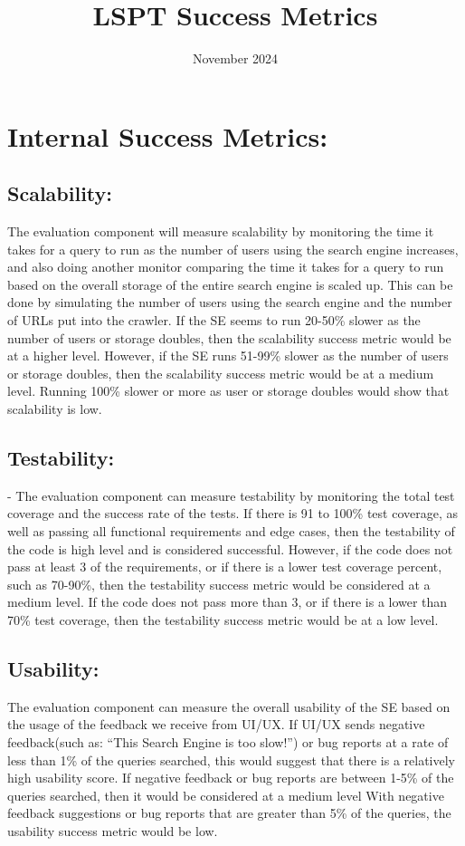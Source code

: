 \documentclass{article}
\title{LSPT Success Metrics}
\date{November 2024}
\begin{document}
\maketitle

\section{Internal Success Metrics:}
\medskip
\subsection{Scalability:}
The evaluation component will measure scalability by monitoring the time it takes
for a query to run as the number of users using the search engine increases, and 
also doing another monitor comparing the time it takes for a query to run based on 
the overall storage of the entire search engine is scaled up. This can be done by 
simulating the number of users using the search engine and the number of URLs put 
into the crawler. If the SE seems to run 20-50\% slower as the number of users or 
storage doubles, then the scalability success metric would be at a higher level. 
However, if the SE runs 51-99\% slower as the number of users or storage doubles, 
then the scalability success metric would be at a medium level. Running 100\% 
slower or more as user or storage doubles would show that scalability is low. 

\smallskip

\subsection{Testability:}
- The evaluation component can measure testability by monitoring the total test 
coverage and the success rate of the tests. If there is 91 to 100\% test coverage, 
as well as passing all functional requirements and edge cases, then the 
testability of the code is high level and is considered successful. However, if 
the code does not pass at least 3 of the requirements, or if there is a lower test 
coverage percent, such as 70-90\%, then the testability success metric would be 
considered at a medium level. If the code does not pass more than 3, or if there 
is a lower than 70\% test coverage, then the testability success metric would be 
at a low level.

\smallskip

\subsection{Usability:}
The evaluation component can measure the overall usability of the SE based on the 
usage of the feedback we receive from UI/UX. If UI/UX sends negative feedback(such 
as: “This Search Engine is too slow!”) or bug reports at a rate of less than 1\% 
of the queries searched, this would suggest that there is a relatively high 
usability score. If negative feedback or bug reports are between 1-5\% of the 
queries searched, then it would be considered at a medium level With negative 
feedback suggestions or bug reports that are greater than 5\% of the queries, the 
usability success metric would be low.
\end{document}
